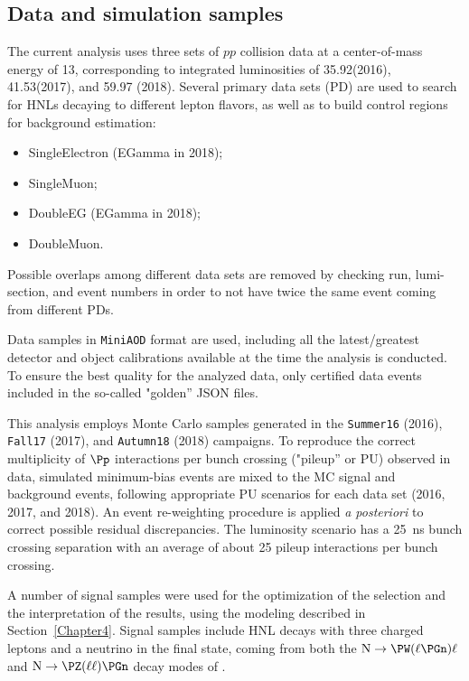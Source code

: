 \subsection{Data and simulation samples}
The current analysis uses three sets of $pp$ collision data at a
center-of-mass energy of 13\TeV, corresponding to integrated
luminosities of 35.92\fbinv (2016), 41.53\fbinv (2017), and 59.97\fbinv
(2018). Several primary data sets (PD) are used to search for HNLs decaying
to different lepton flavors, as well as to build control regions for
background estimation:
\begin{itemize}
\setlength\itemsep{-0.1em}
\item SingleElectron (EGamma in 2018);
\item SingleMuon;
\item DoubleEG (EGamma in 2018);
\item DoubleMuon.
\end{itemize}
Possible overlaps among different data sets are
removed by checking run, lumi-section, and event numbers in order to
not have twice the same event coming from different PDs.

Data samples in \texttt{MiniAOD} format are used, including all the
latest/greatest detector and object calibrations available at the time
the analysis is conducted.
To ensure the best quality for the analyzed data, only certified data
events included in the so-called "golden'' JSON files.

This analysis employs Monte Carlo samples generated in the
\texttt{Summer16} (2016), \texttt{Fall17} (2017), and
\texttt{Autumn18} (2018) campaigns.
To reproduce the correct multiplicity of $\Pp$ interactions per
bunch crossing ("pileup'' or PU) observed in data,
simulated minimum-bias events are mixed to the MC signal and
background events, following appropriate PU scenarios for each data
set (2016, 2017, and 2018).
An event re-weighting procedure is applied \textit{a posteriori} to
correct possible residual discrepancies. The luminosity scenario has a 25~ns bunch crossing separation with an
average of about 25 pileup interactions per bunch crossing. 

A number of signal samples were used for the optimization of the
selection and the interpretation of the results, using the modeling
described in Section~\ref{Chapter4}.
Signal samples include HNL decays with three charged leptons and a
neutrino in the final state, coming from both the
$\hnl\to\PW(\ell\PGn)\ell$ and $\hnl\to\PZ(\ell\ell)\PGn$ decay modes
of \hnl.

